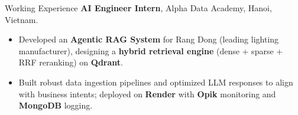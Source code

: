 \begin{rubric}{Working Experience}
%
	\textbf{AI Engineer Intern}, Alpha Data Academy, Hanoi, Vietnam.
	\begin{itemize}
		\item Developed an \textbf{Agentic RAG System} for Rang Dong (leading lighting manufacturer), designing a \textbf{hybrid retrieval engine} (dense + sparse + RRF reranking) on \textbf{Qdrant}.
		\item Built robust data ingestion pipelines and optimized LLM responses to align with business intents; deployed on \textbf{Render} with \textbf{Opik} monitoring and \textbf{MongoDB} logging.
	\end{itemize}
%
\end{rubric}